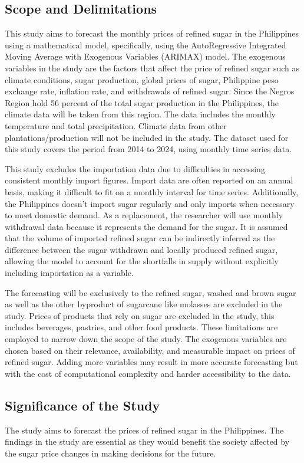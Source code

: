 \documentclass[11pt]{article}
\begin{document}
\subsection{Scope and Delimitations}
This study aims to forecast the monthly prices of refined sugar in the Philippines using a mathematical model, specifically, using the AutoRegressive Integrated Moving Average with Exogenous Variables (ARIMAX) model. The exogenous variables in the study are the factors that affect the price of refined sugar such as climate conditions, sugar production, global prices of sugar, Philippine peso exchange rate, inflation rate, and  withdrawals of refined sugar. Since the Negros Region hold 56 percent of the total sugar production in the Philippines, the climate data will be taken from this region. The data includes the monthly temperature and total precipitation. Climate data from other plantations/production will not be included in the study. The dataset used for this study covers the period from 2014 to 2024, using monthly time series data. 

This study excludes the importation data due to difficulties in accessing consistent monthly import figures. Import data are often reported on an annual basis, making it difficult to fit on a monthly interval for time series.  Additionally, the Philippines doesn’t import sugar regularly and only imports when necessary to meet domestic demand. As a replacement, the researcher will use monthly withdrawal data because it represents the demand for the sugar. It is assumed that the volume of imported refined sugar can be indirectly inferred as the difference between the sugar withdrawn and locally produced refined sugar, allowing the model to account for the shortfalls in supply without explicitly including importation as a variable.

The forecasting will be exclusively to the refined sugar, washed and brown sugar as well as the other byproduct of sugarcane like molasses are excluded in the study. Prices of products that rely on sugar are excluded in the study, this includes beverages, pastries, and other food products. These limitations are employed to narrow down the scope of the study. The exogenous variables are chosen based on their relevance, availability, and measurable impact on prices of refined sugar. Adding more variables may result in more accurate forecasting but with the cost of computational complexity and harder accessibility to the data. 



\subsection{Significance of the Study}
The study aims to forecast the prices of refined sugar in the Philippines. The findings in the study are essential as they would benefit the society affected by the sugar price changes in making decisions for the future. 
\end{document}
